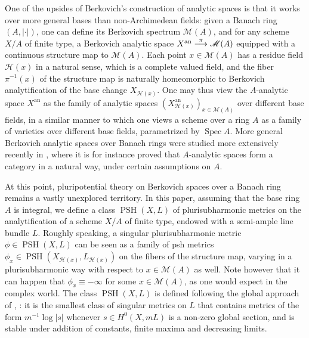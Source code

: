 \documentclass[JEP,XML,SOM,Unicode,published]{cedram}
\newcommand{\To}[1]{\mathchoice{\xrightarrow{\textstyle\kern4pt#1\kern3pt}}{\stackrel{#1}{\longrightarrow}}{}{}}
\theoremstyle{definition}
\newcommand \M {\mathscr {M}}
\newcommand{\an}{\mathrm{an}}
\DeclareMathOperator{\PSH}{PSH}
\DeclareMathOperator{\Sp}{Spec}
\begin{document}
One of the upsides of Berkovich's construction of analytic spaces is that it works over more general bases than non-Archimedean fields: given a Banach ring $(A, \lvert \cdot \rvert)$, one can define its Berkovich spectrum $\M(A)$, and for any scheme $X/A$ of finite type, a Berkovich analytic space $X^{\an} \To{\pi} \M(A)$ equipped with a continuous structure map to $\M(A)$. Each point $x \in \M(A)$ has a residue field $\mathscr{H}(x)$ in a natural sense, which is a complete valued field, and the fiber $\pi^{-1}(x)$ of the structure map is naturally homeomorphic to Berkovich analytification of the base change $X_{\mathscr{H}(x)}$. One may thus view the $A$-analytic space $X^{\an}$ as the family of analytic spaces $(X^{\an}_{\mathscr{H}(x)})_{x \in \M(A)}$ over different base fields, in a similar manner to which one views a scheme over a ring $A$ as a family of varieties over different base fields, parametrized by $\Sp A$. More general Berkovich analytic spaces over Banach rings were studied more extensively recently in \cite{LP}, where it is for instance proved that $A$-analytic spaces form a category in a natural way, under certain assumptions on $A$.

At this point, pluripotential theory on Berkovich spaces over a Banach ring remains a vastly unexplored territory. In this paper, assuming that the base ring $A$ is integral, we define a class $\PSH(X, L)$ of plurisubharmonic metrics on the analytification of a scheme $X/A$ of finite type, endowed with a semi-ample line bundle $L$. Roughly speaking, a singular plurisubharmonic metric $\phi \in \PSH(X, L)$ can be seen as a family of psh metrics $\phi_x \in \PSH(X_{\mathscr{H}(x)}, L_{\mathscr{H}(x)})$ on the fibers of the structure map, varying in a plurisubharmonic way with respect to $x \in \M(A)$ as well. Note however that it can happen that $\phi_x \equiv -\infty$ for some $x \in \M(A)$, as one would expect in the complex world. The class $\PSH(X,L)$ is defined following the global approach of \cite{BFJ2}, \cite{BE}: it is the smallest class of singular metrics on $L$ that contains metrics of the form $m^{-1} \log \lvert s \rvert$ whenever $s \in H^0(X, mL)$ is a non-zero global section, and is stable under addition of constants, finite maxima and decreasing limits.
\end{document}
